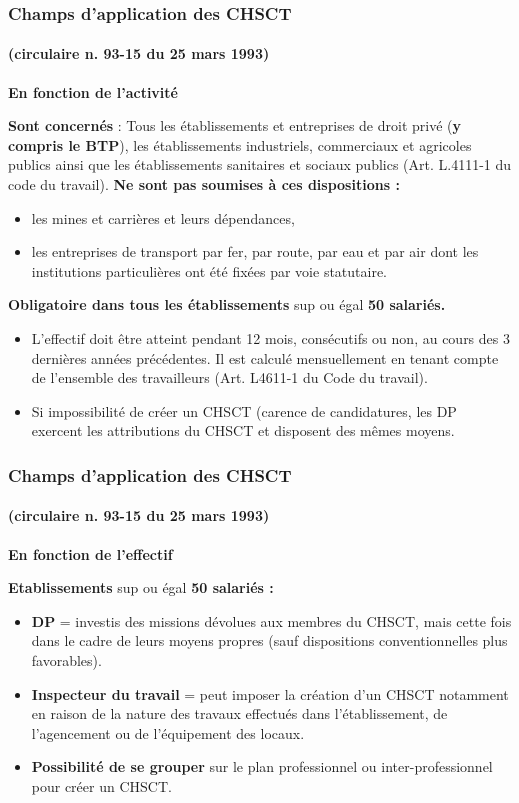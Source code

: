 \documentclass{beamer}
\begin{document}
\begin{frame}
\frametitle{Champs d’application des CHSCT}
\framesubtitle{(circulaire n. 93-15 du 25 mars 1993)}

\textbf{En fonction de l’activité}

\textbf{Sont concernés} : Tous les établissements et entreprises de droit privé (\textbf{y compris le BTP}), les établissements industriels, commerciaux et agricoles publics ainsi que les établissements sanitaires et sociaux publics (Art. L.4111-1  du code du travail).
\textbf{Ne sont pas soumises à ces dispositions :}
\begin{itemize}
        \item les mines et carrières et leurs dépendances, 
        \item les entreprises de transport par fer, par route, par eau et par air dont les institutions particulières ont été fixées par voie statutaire.
\end{itemize}
\textbf{Obligatoire dans tous les établissements} sup ou égal \textbf{50 salariés.}
\begin{itemize}
        \item L'effectif doit être atteint pendant 12 mois, consécutifs ou non, au cours des 3 dernières années précédentes. Il est calculé mensuellement en tenant compte de l'ensemble des travailleurs (Art. L4611-1 du Code du travail).
        \item Si impossibilité de créer un CHSCT (carence de candidatures, les DP exercent les attributions du CHSCT et disposent des mêmes moyens.
\end{itemize}   
\end{frame}

\begin{frame}
\frametitle{Champs d’application des CHSCT}
\framesubtitle{(circulaire n. 93-15 du 25 mars 1993)}

\textbf{En fonction de l’effectif}

\textbf{Etablissements} sup ou égal \textbf{50 salariés :}
\begin{itemize}
        \item \textbf{DP} = investis des missions dévolues aux membres du CHSCT, mais cette fois dans le cadre de leurs moyens propres (sauf dispositions conventionnelles plus favorables). 
        \item \textbf{Inspecteur du travail} = peut imposer la création d'un CHSCT notamment en raison de la nature des travaux effectués dans l'établissement, de l'agencement ou de l'équipement des locaux.
        \item \textbf{Possibilité de se grouper} sur le plan professionnel ou inter-professionnel pour créer un CHSCT.
\end{itemize}
\end{frame} 
\end{document}
